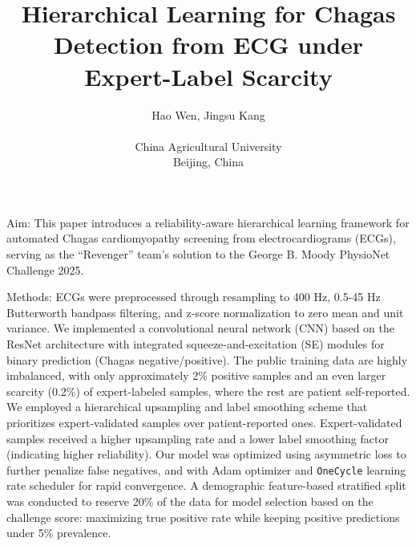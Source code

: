 \documentclass{cinc-abstract}
\begin{document}
\title{Hierarchical Learning for Chagas Detection from ECG under Expert-Label Scarcity}

\author {Hao Wen, Jingsu Kang\\ %
\ \\ %
China Agricultural University\\  %
Beijing, China} %

\maketitle



Aim: This paper introduces a reliability-aware hierarchical learning framework for automated Chagas cardiomyopathy screening from electrocardiograms (ECGs), serving as the ``Revenger'' team's solution to the George B. Moody PhysioNet Challenge 2025.

Methods: ECGs were preprocessed through resampling to 400 Hz, 0.5-45 Hz Butterworth bandpass filtering, and z-score normalization to zero mean and unit variance. We implemented a convolutional neural network (CNN) based on the ResNet architecture with integrated squeeze-and-excitation (SE) modules for binary prediction (Chagas negative/positive). The public training data are highly imbalanced, with only approximately 2\% positive samples and an even larger scarcity (0.2\%) of expert-labeled samples, where the rest are patient self-reported. We employed a hierarchical upsampling and label smoothing scheme that prioritizes expert-validated samples over patient-reported ones. Expert-validated samples received a higher upsampling rate and a lower label smoothing factor (indicating higher reliability). Our model was optimized using asymmetric loss to further penalize false negatives, and with Adam optimizer and \texttt{OneCycle} learning rate scheduler for rapid convergence. A demographic feature-based stratified split was conducted to reserve 20\% of the data for model selection based on the challenge score: maximizing true positive rate while keeping positive predictions under 5\% prevalence.
\end{document}
